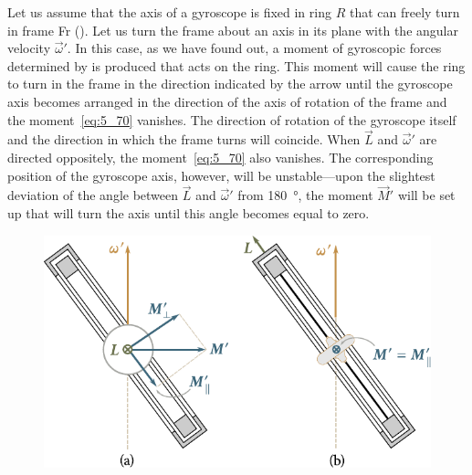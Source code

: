 Let us assume that the axis of a gyroscope is fixed in ring $R$ that can freely turn in frame Fr (). Let us turn the frame about an axis in its plane with the angular velocity $\vec{\omega}'$. In this case, as we have found out, a moment of gyroscopic forces determined by  is produced that acts on the ring. This moment will cause the ring to turn in the frame in the direction indicated by the arrow until the gyroscope axis becomes arranged in the direction of the axis of rotation of the frame and the moment~\eqref{eq:5_70} vanishes. The direction of rotation of the gyroscope itself and the direction in which the frame turns will coincide. When $\vec{L}$ and $\vec{\omega}'$ are directed oppositely, the moment~\eqref{eq:5_70} also vanishes. The corresponding position of the gyroscope axis, however, will be unstable---upon the slightest deviation of the angle between $\vec{L}$ and $\vec{\omega}'$ from \SI{180}{\degree}, the moment $\vec{M}'$ will be set up that will turn the axis until this angle becomes equal to zero.

\begin{figure}[t]
	\begin{center}
		\includegraphics[scale=0.95]{figures/ch_05/fig_5_27.pdf}
		\caption[]{}
		\label{fig:5_27}
	\end{center}
	\vspace{-0.9cm}
\end{figure}

